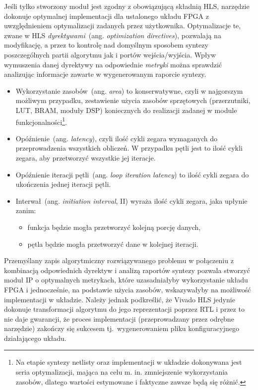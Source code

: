 Jeśli tylko stworzony moduł jest zgodny z obowiązującą składnią HLS, narzędzie dokonuje optymalnej implementacji dla ustalonego układu FPGA z uwzględnieniem optymalizacji zadanych przez użytkownika. Optymalizacje te, zwane w HLS \textit{dyrektywami}~(ang. \textit{optimization directives}), pozwalają na modyfikację, a przez to kontrolę nad domyślnym sposobem syntezy poszczególnych partii algorytmu jak i portów wejścia/wyjścia. Wpływ wymuszenia danej dyrektywy na odpowiednie \textit{metryki} można sprawdzić analizując informacje zawarte w wygenerowanym raporcie syntezy.
\begin{itemize}
\item Wykorzystanie zasobów~(ang. \textit{area}) to konserwatywne, czyli w najgorszym możliwym przypadku, zestawienie użycia zasobów sprzętowych (przerzutniki, LUT, BRAM, moduły DSP) koniecznych do realizacji zadanej w module funkcjonalności\footnote{Na etapie syntezy netlisty oraz implementacji w układzie dokonywana jest seria optymalizacji, mająca na celu m. in. zmniejszenie wykorzystania zasobów, dlatego wartości estymowane i faktyczne zawsze będą się różnić.}. 
\item Opóźnienie~(ang. \textit{latency}), czyli ilość cykli zegara wymaganych do przeprowadzenia wszystkich obliczeń. W przypadku pętli jest to ilość cykli zegara, aby przetworzyć wszystkie jej iteracje.
\item Opóźnienie iteracji pętli~(ang. \textit{loop iteration latency}) to ilość cykli zegara do ukończenia jednej iteracji pętli.
\item Interwał~(ang. \textit{initiation interval}, II) wyraża ilość cykli zegara, jaka upłynie zanim:
\begin{itemize}
\item funkcja będzie mogła przetworzyć kolejną porcję danych,
\item pętla będzie mogła przetworzyć dane w kolejnej iteracji.
\end{itemize} 
\end{itemize}
Przemyślany zapis algorytmiczny rozwiązywanego problemu w połączeniu z kombinacją odpowiednich dyrektyw i analizą raportów syntezy pozwala stworzyć moduł IP o optymalnych metrykach, które uzasadniałyby wykorzystanie układu FPGA i jednocześnie, na podstawie użycia zasobów, wskazywałyby na możliwość implementacji w układzie. Należy jednak podkreślić, że Vivado HLS jedynie dokonuje transformacji algorytmu do jego reprezentacji poprzez RTL i przez to nie daje gwarancji, że proces implementacji (przeprowadzany przez odrębne narzędzie) zakończy się sukcesem tj.~wygenerowaniem pliku konfiguracyjnego działającego układu.

